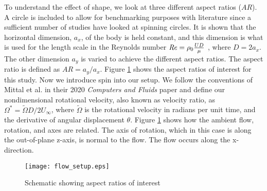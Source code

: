 To understand the effect of shape, we look at three different aspect ratios ($AR$). A circle is included to allow for benchmarking purposes with literature since a sufficient number of studies have looked at spinning circles. It is shown that the horizontal dimension, $a_x$, of the body is held constant, and this dimension is what is used for the length scale in the Reynolds number $\mathit{Re} = \rho_0 \frac{U D}{\mu}$ , where $D = 2a_x$. The other dimension $a_y$ is varied to achieve the different aspect ratios. The aspect ratio is defined as $AR = a_y/a_x$. Figure \ref{fig:flow setup} shows the aspect ratios of interest for this study. 
Now we introduce spin into our setup. We follow the conventions of Mittal et al. in their 2020 \textit{Computers and Fluids} paper \cite{mittal_direct_2020} and define our nondimensional rotational velocity, also known as velocity ratio, as $\Omega^{\ast} = \tilde{\Omega}D/2 U_{\infty}$, where $\tilde{\Omega}$ is the rotational velocity in radians per unit time, and the derivative of angular displacement $\theta$. Figure \ref{fig:flow setup} shows how the ambient flow, rotation, and axes are related. The axis of rotation, which in this case is along the out-of-plane z-axis, is normal to the flow. The flow occurs along the x-direction. 
\begin{figure}
    \centerline{\texttt{[image: flow\_setup.eps]}}
    \caption{Schematic showing aspect ratios of interest}
    \label{fig:flow setup}
\end{figure}

